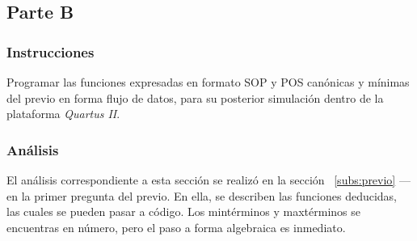 \documentclass[../procedimientos.tex]{subfiles}
\begin{document}
\clearpage
\subsection{Parte B}
\subsubsection{Instrucciones}
\begin{em}
  Programar las funciones expresadas en formato SOP y POS canónicas y mínimas 
  del previo en forma flujo de datos, para su posterior simulación dentro de la plataforma
  \textit{Quartus II}.
\end{em}

\subsubsection{Análisis}\label{subs:analisis_b}
El análisis correspondiente a esta sección se realizó en la sección 
~\ref{subs:previo} ---en la primer pregunta del previo. En ella, se describen 
las funciones deducidas, las cuales se pueden pasar a código. Los mintérminos 
y maxtérminos se encuentras en número, pero el paso a forma algebraica es 
inmediato.
\end{document}
